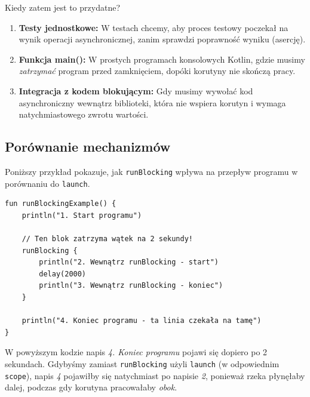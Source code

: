 Kiedy zatem jest to przydatne? 
\begin{enumerate} 
    \item \textbf{Testy jednostkowe:} W testach chcemy, aby proces testowy poczekał na wynik operacji asynchronicznej, zanim sprawdzi poprawność wyniku (asercję). 
    \item \textbf{Funkcja main():} W prostych programach konsolowych Kotlin, gdzie musimy \textit{zatrzymać} program przed zamknięciem, dopóki korutyny nie skończą pracy. 
    \item \textbf{Integracja z kodem blokującym:} Gdy musimy wywołać kod asynchroniczny wewnątrz biblioteki, która nie wspiera korutyn i wymaga natychmiastowego zwrotu wartości. 
\end{enumerate}

\subsection{Porównanie mechanizmów} 
Poniższy przykład pokazuje, jak \texttt{runBlocking} wpływa na przepływ programu w porównaniu do \texttt{launch}.

\begin{verbatim} 
fun runBlockingExample() { 
    println("1. Start programu")

    // Ten blok zatrzyma wątek na 2 sekundy!
    runBlocking {
        println("2. Wewnątrz runBlocking - start")
        delay(2000)
        println("3. Wewnątrz runBlocking - koniec")
    }

    println("4. Koniec programu - ta linia czekała na tamę")
} 
\end{verbatim}

W powyższym kodzie napis \textit{4. Koniec programu} pojawi się dopiero po 2 sekundach. Gdybyśmy zamiast \texttt{runBlocking} użyli \texttt{launch} (w odpowiednim \texttt{scope}), napis \textit{4} pojawiłby się natychmiast po napisie \textit{2}, ponieważ rzeka płynęłaby dalej, podczas gdy korutyna pracowałaby \textit{obok}.